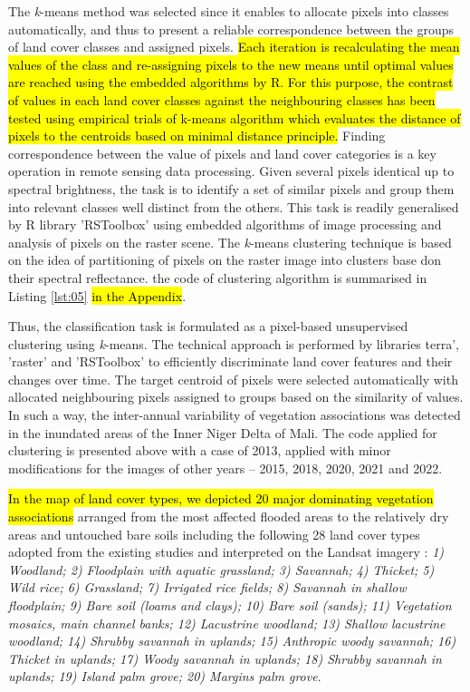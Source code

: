 \documentclass[12pt,a4paper,oneside]{article}
\def \newpar{\vspace{6pt}}
\begin{document}
\newpar The \emph{k}-means method was selected since it enables to allocate pixels into classes automatically, and thus to present a reliable correspondence between the groups of land cover classes and assigned pixels. \hl{Each iteration is recalculating the mean values of the class and re-assigning pixels to the new means until optimal values are reached using the embedded algorithms by R. For this purpose, the contrast of values in each land cover classes against the neighbouring classes has been tested using empirical trials of k-means algorithm which evaluates the distance of pixels to the centroids based on minimal distance principle.} Finding correspondence between the value of pixels and land cover categories is a key operation in remote sensing data processing. Given several pixels identical up to spectral brightness, the task is to identify a set of similar pixels and group them into relevant classes well distinct from the others. This task is readily generalised by R library 'RSToolbox' using embedded algorithms of image processing and analysis of pixels on the raster scene. The \emph{k}-means clustering technique is based on the idea of partitioning of pixels on the raster image into clusters base don their spectral reflectance. the code of clustering algorithm is summarised in Listing \ref{lst:05} \hl{in the Appendix}.

\newpar Thus, the classification task is formulated as a pixel-based unsupervised clustering using \emph{k}-means. The technical approach is performed by libraries terra', 'raster' and 'RSToolbox' to efficiently discriminate land cover features and their changes over time. The target centroid of pixels were selected automatically with allocated neighbouring pixels assigned to groups based on the similarity of values. In such a way, the inter-annual variability of vegetation associations was detected in the inundated areas of the Inner Niger Delta of Mali. The code applied for clustering is presented above with a case of 2013, applied with minor modifications for the images of other years -- 2015, 2018, 2020, 2021 and 2022.

\newpar \hl{In the map of land cover types, we depicted 20 major dominating vegetation associations} arranged from the most affected flooded areas to the relatively dry areas and untouched bare soils including the following 28 land cover types adopted from the existing studies and interpreted on the Landsat imagery \cite{Marie}: \emph{1) Woodland; 2) Floodplain with aquatic grassland; 3) Savannah; 4) Thicket; 5) Wild rice; 6) Grassland; 7) Irrigated rice fields; 8) Savannah in shallow floodplain; 9) Bare soil (loams and clays); 10) Bare soil (sands); 11) Vegetation mosaics, main channel banks; 12) Lacustrine woodland; 13) Shallow lacustrine woodland; 14) Shrubby savannah in uplands; 15) Anthropic woody savannah; 16) Thicket in uplands; 17) Woody savannah in uplands; 18) Shrubby savannah in uplands; 19) Island palm grove; 20) Margins palm grove}.
\end{document}
